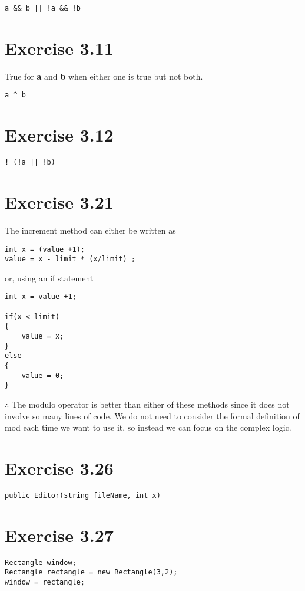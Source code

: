 \documentclass[10pt,a4paper]{article}
\begin{document}
\begin{lstlisting}
a && b || !a && !b
\end{lstlisting}

\section*{Exercise 3.11}
True for \textbf{a} and \textbf{b} when either one is true but not both.

\begin{lstlisting}
a ^ b
\end{lstlisting}

\section*{Exercise 3.12}
\begin{lstlisting}
! (!a || !b)
\end{lstlisting}

\section*{Exercise 3.21}
The increment method can either be written as
\begin{lstlisting}
int x = (value +1);
value = x - limit * (x/limit) ;
\end{lstlisting}
or, using an if statement
\begin{lstlisting}
int x = value +1;
        
if(x < limit)
{
    value = x;
}
else
{
    value = 0;
}
\end{lstlisting}
$\therefore$ The modulo operator is better than either of these methods since it does not involve so many lines of code. We do not need to consider the formal definition of mod each time we want to use it, so instead we can focus on the complex logic.

\section*{Exercise 3.26}
\begin{lstlisting}
public Editor(string fileName, int x)
\end{lstlisting}

\section*{Exercise 3.27}
\begin{lstlisting}
Rectangle window;
Rectangle rectangle = new Rectangle(3,2);
window = rectangle;
\end{lstlisting}
\end{document}
